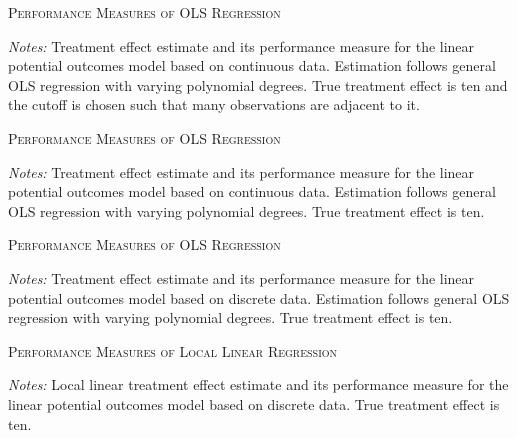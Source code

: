 \documentclass[11pt, a4paper, leqno]{article}
\begin{document}
\begin{table}
	\centering

	

	\caption{\textsc{Performance Measures of OLS Regression}}
	\label{tab:perform_meas_table_linear_parametric_discrete_False_c_10}
	\medskip
	\raggedright
	\footnotesize
	\textit{Notes:} Treatment effect estimate and its performance measure for the linear potential outcomes model based on continuous data. Estimation follows general OLS regression with varying polynomial degrees. True treatment effect is ten and the cutoff is chosen such that many observations are adjacent to it. \\
\end{table}


\begin{table}
	\centering

	

	\caption{\textsc{Performance Measures of OLS Regression}}
	\label{tab:perform_meas_table_linear_parametric_discrete_False}
	\medskip
	\raggedright
	\footnotesize
	\textit{Notes:} Treatment effect estimate and its performance measure for the linear potential outcomes model based on continuous data. Estimation follows general OLS regression with varying polynomial degrees. True treatment effect is ten. \\
\end{table}


\begin{table}
	\centering

	

	\caption{\textsc{Performance Measures of OLS Regression}}
	\label{tab:perform_meas_table_linear_parametric_discrete_True}
	\medskip
	\raggedright
	\footnotesize
	\textit{Notes:} Treatment effect estimate and its performance measure for the linear potential outcomes model based on discrete data. Estimation follows general OLS regression with varying polynomial degrees. True treatment effect is ten. \\
\end{table}


\begin{table}
	\centering

	

	\caption{\textsc{Performance Measures of Local Linear Regression}}
	\label{tab:perform_meas_table_linear_nonparametric_discrete_True}
	\medskip
	\raggedright
	\footnotesize
	\textit{Notes:} Local linear treatment effect estimate and its performance measure for the linear potential outcomes model based on discrete data. True treatment effect is ten. \\
\end{table}
\end{document}

